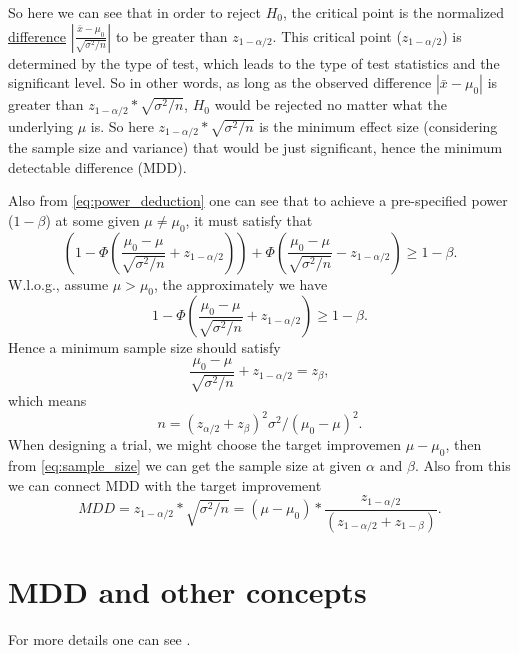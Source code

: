 \documentclass[a4paper,12pt]{article}
\begin{document}
So here we can see that in order to reject $H_0$, the critical point is the normalized \underline{difference} $\left|\frac{\bar{x} - \mu_0}{\sqrt{\sigma^2 / n}}\right|$ to be greater than $z_{1 - \alpha / 2}$. This critical point ($z_{1 - \alpha / 2}$) is determined by the type of test, which leads to the type of test statistics and the significant level. So in other words, as long as the observed difference $\left|\bar{x} - \mu_0\right|$ is greater than $z_{1 - \alpha / 2} * \sqrt{\sigma^2 / n}$, $H_0$ would be rejected no matter what the underlying $\mu$ is. So here $z_{1 - \alpha / 2} * \sqrt{\sigma^2 / n}$ is the minimum effect size (considering the sample size and variance) that would be just significant, hence the minimum detectable difference (MDD).
\par
Also from \eqref{eq:power_deduction} one can see that to achieve a pre-specified power ($1 - \beta$) at some given $\mu \neq \mu_0$, it must satisfy that
\[
  \left(
    1 - \Phi\left(
      \frac{\mu_0 - \mu}{\sqrt{\sigma^2 / n}}
      + z_{1 - \alpha / 2}
    \right)
  \right)
  + \Phi\left(
    \frac{\mu_0 - \mu}{\sqrt{\sigma^2 / n}}
    - z_{1 - \alpha / 2}
  \right)
  \geq
  1 - \beta
  .
\]
W.l.o.g., assume $\mu > \mu_0$, the approximately we have
\[
  1 - \Phi\left(
    \frac{\mu_0 - \mu}{\sqrt{\sigma^2 / n}}
    + z_{1 - \alpha / 2}
  \right)
  \geq 1 - \beta
  .
\]
Hence a minimum sample size should satisfy
\[
  \frac{\mu_0 - \mu}{\sqrt{\sigma^2 / n}}
  + z_{1 - \alpha / 2}
  =
  z_{\beta}
  ,
\]
which means
\begin{equation}
  \label{eq:sample_size}
    n = \left(z_{\alpha / 2} + z_\beta\right)^2\sigma^2 / \left(\mu_0 - \mu\right)^2
  .
\end{equation}
When designing a trial, we might choose the target improvemen $\mu - \mu_0$, then from \eqref{eq:sample_size} we can get the sample size at given $\alpha$ and $\beta$. Also from this we can connect MDD with the target improvement
\[
  MDD
  = z_{1 - \alpha / 2} * \sqrt{\sigma^2 / n}
  = \left(\mu - \mu_0\right) * \frac{z_{1 - \alpha / 2}}{\left(z_{1 - \alpha / 2} + z_{1 - \beta}\right)} 
  .
\]
\section{MDD and other concepts}
\label{sec:mdd-other-concepts}









For more details one can see \citet{Mair2020p2109-2123}.




\end{document}
